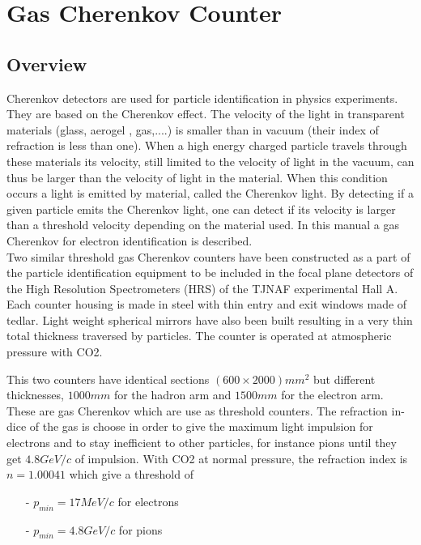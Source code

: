 \documentclass[12pt]{article}
\begin{document}
\section{Gas Cherenkov Counter}

\subsection{Overview}

Cherenkov detectors are used for particle identification in physics experiments. 
They are based on the Cherenkov effect. The velocity
of the light in transparent materials (glass, aerogel , gas,....) is 
smaller than in vacuum (their index of refraction is less than one). When
a high energy charged particle travels through these materials its velocity,
still limited to the velocity of light in the vacuum, can thus be larger
than the velocity of light in the material. When this condition occurs a
light is emitted by material, called the Cherenkov light. By detecting if a given particle
emits the Cherenkov light, one can detect if its velocity is larger than a 
threshold velocity depending on the material used. In this manual a gas 
Cherenkov for electron identification is described.
\\
Two similar threshold gas Cherenkov counters have been constructed as a part
of the particle identification equipment to be included in the focal plane 
detectors of the High Resolution Spectrometers (HRS) of the TJNAF experimental
Hall A. Each counter housing is made in steel with thin entry and exit
windows made of tedlar. Light weight spherical mirrors have also been built 
resulting in a very thin total thickness traversed by particles. The counter is
operated at atmospheric pressure with CO2.

This two counters have identical sections $(600 \times 2000)mm^2$ but
different thicknesses, $1000mm$ for the hadron arm and $1500mm$ for the
electron arm. These are gas Cherenkov which are use as threshold counters. 
The refraction in-dice of the gas is choose in order to give the maximum
light impulsion for electrons and to stay inefficient to other particles, 
for instance pions until they get $4.8GeV/c$ of impulsion. 
With CO2 at normal pressure, the refraction 
index  is $n=1.00041$ which give a threshold of
\begin{itemize}
\item[-] $p_{min} = 17 MeV/c $ for electrons
\item[-] $p_{min} = 4.8 GeV/c $ for pions
\end{itemize}
\end{document}
